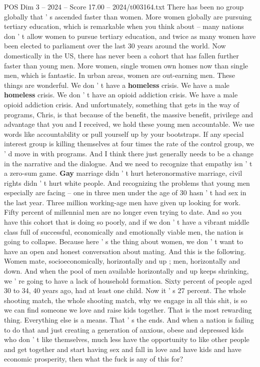 \begin{textsample}{POS Dim 3 – 2024 – Score 17.00 – 2024/t003164.txt}
There has been no group globally that ' s ascended faster than women.
More women globally are pursuing tertiary education, which is remarkable when you think about -- many nations don ' t allow women to pursue tertiary education, and twice as many women have been elected to parliament over the last 30 years around the world.
Now domestically in the US, there has never been a cohort that has fallen further faster than young men.
More women, single women own homes now than single men, which is fantastic.
In urban areas, women are out-earning men.
These things are wonderful.
We don ' t have a \textbf{homeless} crisis.
We have a male \textbf{homeless} crisis.
We don ' t have an opioid addiction crisis.
We have a male opioid addiction crisis.
And unfortunately, something that gets in the way of programs, Chris, is that because of the benefit, the massive benefit, privilege and advantage that you and I received, we hold these young men accountable.
We use words like accountability or pull yourself up by your bootstraps.
If any special interest group is killing themselves at four times the rate of the control group, we ' d move in with programs.
And I think there just generally needs to be a change in the narrative and the dialogue.
And we need to recognize that empathy isn ' t a zero-sum game. \textbf{Gay} marriage didn ' t hurt heteronormative marriage, civil rights didn ' t hurt white people.
And recognizing the problems that young men especially are facing -- one in three men under the age of 30 hasn ' t had sex in the last year.
Three million working-age men have given up looking for work.
Fifty percent of millennial men are no longer even trying to date.
And so you have this cohort that is doing so poorly, and if we don ' t have a vibrant middle class full of successful, economically and emotionally viable men, the nation is going to collapse.
Because here ' s the thing about women, we don ' t want to have an open and honest conversation about mating.
And this is the following.
Women mate, socioeconomically, horizontally and up ; men, horizontally and down.
And when the pool of men available horizontally and up keeps shrinking, we ' re going to have a lack of household formation.
Sixty percent of people aged 30 to 34, 40 years ago, had at least one child.
Now it ' s 27 percent.
The whole shooting match, the whole shooting match, why we engage in all this shit, is so we can find someone we love and raise kids together.
That is the most rewarding thing.
Everything else is a means.
That ' s the ends.
And when a nation is failing to do that and just creating a generation of anxious, obese and depressed kids who don ' t like themselves, much less have the opportunity to like other people and get together and start having sex and fall in love and have kids and have economic prosperity, then what the fuck is any of this for?

\end{textsample}
